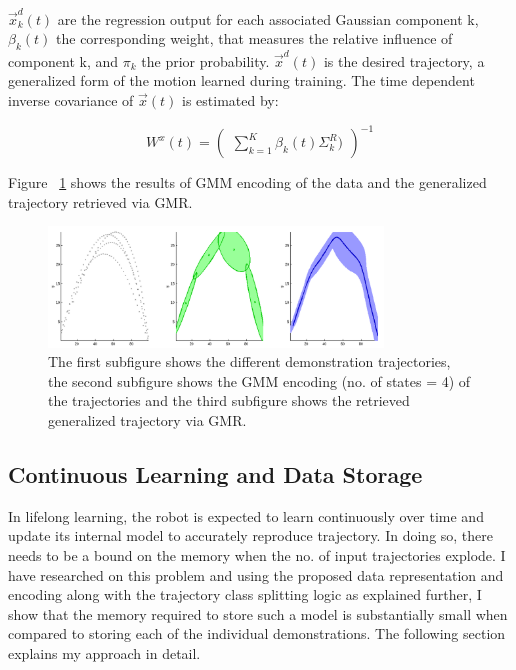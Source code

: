 \documentclass[conference]{IEEEtran}
\begin{document}
\begin{itemize}
{    $\vec{x}_{k}^{d}(t)$ are the regression output for each associated Gaussian component k, $\beta_{k}(t)$ the corresponding weight, that measures the relative influence of component k, and $\pi_{k}$ the prior probability. $\vec{x}^{d}(t)$ is the desired trajectory, a generalized form of the motion learned during training. The time dependent inverse covariance of $\vec{x}(t)$ is estimated by:

    \begin{equation}
        W^{x}(t)= \begin{pmatrix}{\sum_{k=1}^{K} \beta_{k}(t) {\Sigma}_{k}^{R})}\end{pmatrix}^{-1}
    \end{equation}
}
\end{itemize}

Figure ~\ref{fig:fig3} shows the results of GMM encoding of the data and the generalized trajectory retrieved via GMR.

\begin{figure}[!t]
\centering
\includegraphics[width=3.5in]{fig3}
\caption{The first subfigure shows the different demonstration trajectories, the second subfigure shows the GMM encoding (no. of states =  4) of the trajectories and the third subfigure shows the retrieved generalized trajectory via GMR.}
\label{fig:fig3}
\end{figure}

\subsection{Continuous Learning and Data Storage}
In lifelong learning, the robot is expected to learn continuously over time and update its internal model to accurately reproduce trajectory. In doing so, there needs to be a bound on the memory when the no. of input trajectories explode. I have researched on this problem and using the proposed data representation and encoding along with the trajectory class splitting logic as explained further, I show that the memory required to store such a model is substantially small when compared to storing each of the individual demonstrations. The following section explains my approach in detail. 
\end{document}
